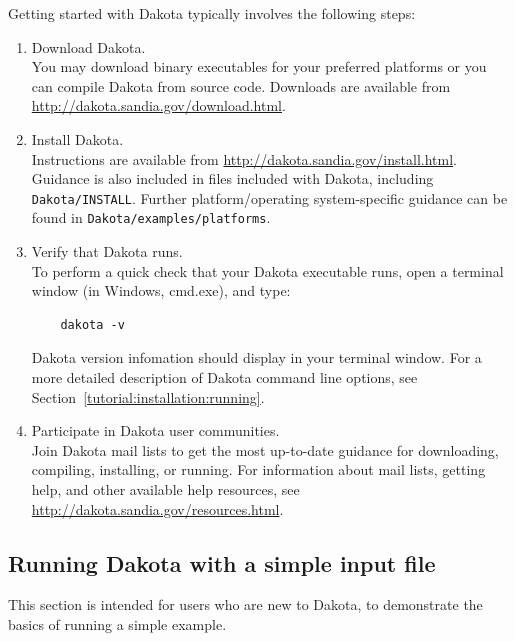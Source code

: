 Getting started with Dakota typically involves the following steps:
\begin{enumerate}
  \item Download Dakota. \\
    You may download binary executables for your preferred platforms or 
    you can compile Dakota from source code. Downloads are available from 
    \url{http://dakota.sandia.gov/download.html}.
    
  \item Install Dakota. \\
    Instructions are available from 
    \url{http://dakota.sandia.gov/install.html}. Guidance is also 
    included in files included with Dakota, including
    \texttt{Dakota/INSTALL}. Further platform/operating system-specific
    guidance can be found in {\tt Dakota/examples/platforms}.

  \item Verify that Dakota runs. \\
    To perform a quick check that your Dakota executable runs, open a 
    terminal window (in Windows, cmd.exe), and type: \\
    \vspace{-2em}
    \begin{small}
    \begin{verbatim}
    dakota -v
    \end{verbatim}
      \end{small}
    \vspace{-2em}
    Dakota version infomation should display in your terminal window.
    For a more detailed description of Dakota command line options, see
    Section~\ref{tutorial:installation:running}.

  \item Participate in Dakota user communities. \\
    Join Dakota mail lists to get the most up-to-date guidance for
    downloading, compiling, installing, or running. For information about
    mail lists, getting help, and other available help resources, see \\
    \url{http://dakota.sandia.gov/resources.html}.

\end{enumerate}

\subsection{Running Dakota with a simple input file}\label{tutorial:quickstart:running}
This section is intended for users who are new to Dakota, to demonstrate the basics 
of running a simple example. 

